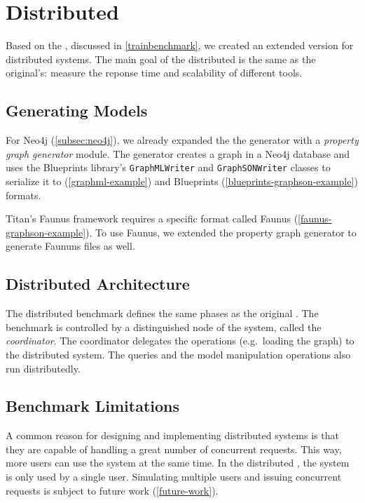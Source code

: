 \section{Distributed \tb{}}
\label{distributed-trainbenchmark}

Based on the \tb{}, discussed in \autoref{trainbenchmark}, we created an extended version for distributed systems. The main goal of the distributed \tb{} is the same as the original's: measure the reponse time and scalability of different tools.

\subsection{Generating Models}

For Neo4j (\autoref{subsec:neo4j}), we already expanded the the generator with a \emph{property graph generator} module. The generator creates a graph in a Neo4j database and uses the Blueprints library's \texttt{GraphMLWriter} and \texttt{GraphSONWriter} classes to serialize it to \graphml{} (\autoref{graphml-example}) and Blueprints \graphson{} (\autoref{blueprints-graphson-example}) formats. 

Titan's Faunus framework requires a specific format called Faunus \graphson{} (\autoref{faunus-graphson-example}). To use Faunus, we extended the property graph generator to generate Faununs \graphson{} files as well.

\subsection{Distributed Architecture}

The distributed benchmark defines the same phases as the original \tb{}. The benchmark is controlled by a distinguished node of the system, called the \emph{coordinator}. The coordinator delegates the operations (e.g.\ loading the graph) to the distributed system. The queries and the model manipulation operations also run distributedly.


\subsection{Benchmark Limitations}

A common reason for designing and implementing distributed systems is that they are capable of handling a great number of concurrent requests. This way, more users can use the system at the same time. In the distributed \tb{}, the system is only used by a single user. Simulating multiple users and issuing concurrent requests is subject to future work (\autoref{future-work}).

